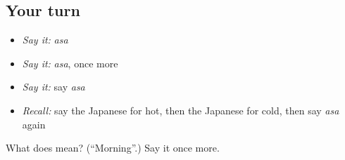 \subsection*{Your turn}
\begin{itemize}
\raggedright
  \item \emph{Say it:} \emph{asa}
  \item \emph{Say it:} \emph{asa}, once more
  \item \emph{Say it:} say \emph{asa}
  \item \emph{Recall:} say the Japanese for hot, then the Japanese for cold, then say \emph{asa} again
\end{itemize}

\begin{tcolorbox}[breakable,colback=teal!4,colframe=teal!35!black,title={Before you move on}]
What does  mean? (\textquotedblleft{}Morning\textquotedblright{}.) Say it once more.
\end{tcolorbox}
